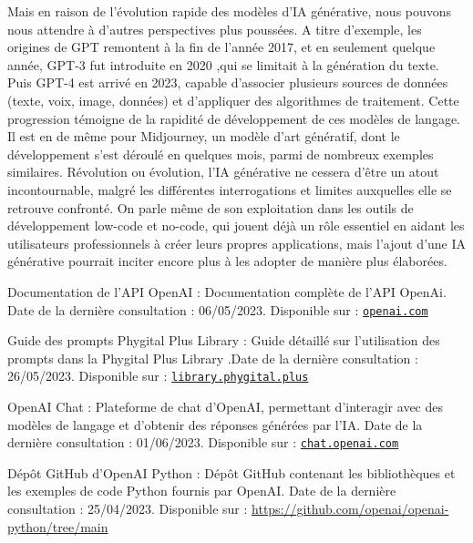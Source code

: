 \documentclass[11,5pt]{report}
\begin{document}
\begin{spacing}{2}
\begin{spacing}{2}
\begin{onehalfspace}
\newline
Mais en raison de l’évolution rapide des modèles d’IA générative, nous pouvons nous attendre à d’autres perspectives plus poussées. A titre d’exemple, les origines de GPT remontent à la fin de l’année 2017, et en seulement quelque année, GPT-3 fut introduite en 2020 ,qui se limitait à la génération du texte. Puis GPT-4 est arrivé en 2023, capable d’associer plusieurs sources de données (texte, voix, image, données) et d’appliquer des algorithmes de traitement\cite{BlogBus}. Cette progression témoigne de la rapidité de développement de ces modèles de langage. Il est en de même pour Midjourney, un modèle d’art génératif, dont le développement s’est déroulé en quelques mois, parmi de nombreux exemples similaires\cite{Blog}. Révolution ou évolution, l’IA générative ne cessera d’être un atout incontournable, malgré les différentes interrogations et limites auxquelles elle se retrouve confronté. On parle même de son exploitation dans les outils de développement low-code et no-code\cite{MondeInfo}, qui jouent déjà un rôle essentiel en aidant les utilisateurs professionnels à créer leurs propres applications, mais l’ajout d’une IA générative pourrait inciter encore plus à les adopter de manière plus élaborées.
\end{onehalfspace}


\renewcommand{\bibname}{Webographie}

\begin{thebibliography}{6}
  
  Documentation de l'API OpenAI : Documentation complète de l'API OpenAi. Date de la dernière consultation : 06/05/2023. Disponible sur : \href{https://platform.openai.com/docs/api-reference/introduction}{\nolinkurl{openai.com}}
  
  Guide des prompts Phygital Plus Library : Guide détaillé sur l'utilisation des prompts dans la Phygital Plus Library .Date de la dernière consultation : 26/05/2023. Disponible sur : \href{https://library.phygital.plus/promptguide}{\nolinkurl{library.phygital.plus}}
  
  OpenAI Chat : Plateforme de chat d'OpenAI, permettant d'interagir avec des modèles de langage et d'obtenir des réponses générées par l'IA. Date de la dernière consultation : 01/06/2023. Disponible sur : \href{https://chat.openai.com}{\nolinkurl{chat.openai.com}}
  
  Dépôt GitHub d'OpenAI Python : Dépôt GitHub contenant les bibliothèques et les exemples de code Python fournis par OpenAI. Date de la dernière consultation : 25/04/2023. Disponible sur : \url{https://github.com/openai/openai-python/tree/main}
  

\end{thebibliography}
\end{spacing}
\end{spacing}
\end{document}
